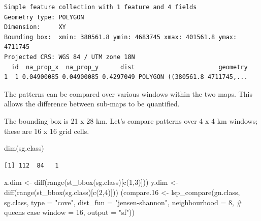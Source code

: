 \documentclass[
  letterpaper,
  DIV=11,
  numbers=noendperiod]{scrartcl}
\newenvironment{Shaded}{\begin{snugshade}}{\end{snugshade}}
\newcommand{\AttributeTok}[1]{\textcolor[rgb]{0.40,0.45,0.13}{#1}}
\newcommand{\CommentTok}[1]{\textcolor[rgb]{0.37,0.37,0.37}{#1}}
\newcommand{\DecValTok}[1]{\textcolor[rgb]{0.68,0.00,0.00}{#1}}
\newcommand{\FloatTok}[1]{\textcolor[rgb]{0.68,0.00,0.00}{#1}}
\newcommand{\FunctionTok}[1]{\textcolor[rgb]{0.28,0.35,0.67}{#1}}
\newcommand{\NormalTok}[1]{\textcolor[rgb]{0.00,0.23,0.31}{#1}}
\newcommand{\OtherTok}[1]{\textcolor[rgb]{0.00,0.23,0.31}{#1}}
\newcommand{\StringTok}[1]{\textcolor[rgb]{0.13,0.47,0.30}{#1}}
\begin{document}
\begin{verbatim}
Simple feature collection with 1 feature and 4 fields
Geometry type: POLYGON
Dimension:     XY
Bounding box:  xmin: 380561.8 ymin: 4683745 xmax: 401561.8 ymax: 4711745
Projected CRS: WGS 84 / UTM zone 18N
  id  na_prop_x  na_prop_y      dist                       geometry
1  1 0.04900085 0.04900085 0.4297049 POLYGON ((380561.8 4711745,...
\end{verbatim}

The patterns can be compared over various windows within the two maps.
This allows the difference between sub-maps to be quantified.

The bounding box is 21 x 28 km. Let's compare patterns over 4 x 4 km
windows; these are 16 x 16 grid cells.

\begin{Shaded}
\begin{Highlighting}[]
\FunctionTok{dim}\NormalTok{(sg.class)}
\end{Highlighting}
\end{Shaded}

\begin{verbatim}
[1] 112  84   1
\end{verbatim}

\begin{Shaded}
\begin{Highlighting}[]
\NormalTok{x.dim }\OtherTok{\textless{}{-}} \FunctionTok{diff}\NormalTok{(}\FunctionTok{range}\NormalTok{(}\FunctionTok{st\_bbox}\NormalTok{(sg.class)[}\FunctionTok{c}\NormalTok{(}\DecValTok{1}\NormalTok{,}\DecValTok{3}\NormalTok{)]))}
\NormalTok{y.dim }\OtherTok{\textless{}{-}} \FunctionTok{diff}\NormalTok{(}\FunctionTok{range}\NormalTok{(}\FunctionTok{st\_bbox}\NormalTok{(sg.class)[}\FunctionTok{c}\NormalTok{(}\DecValTok{2}\NormalTok{,}\DecValTok{4}\NormalTok{)]))}
\NormalTok{(compare}\FloatTok{.16} \OtherTok{\textless{}{-}} \FunctionTok{lsp\_compare}\NormalTok{(gn.class, sg.class, }
                           \AttributeTok{type =} \StringTok{"cove"}\NormalTok{, }\AttributeTok{dist\_fun =} \StringTok{"jensen{-}shannon"}\NormalTok{,}
                           \AttributeTok{neighbourhood =} \DecValTok{8}\NormalTok{, }\CommentTok{\# queen\textquotesingle{}s case}
                           \AttributeTok{window =} \DecValTok{16}\NormalTok{,}
                           \AttributeTok{output =} \StringTok{"sf"}\NormalTok{))}
\end{Highlighting}
\end{Shaded}
\end{document}

